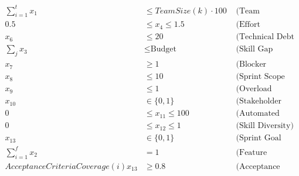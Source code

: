 \documentclass{article}
\begin{document}
\begin{align*}
\sum_{i=1}^{t} x_1 &\leq TeamSize(k) \cdot 100  &\text{ (Team Capacity)} \\
0.5 &\leq x_4 \leq 1.5  &\text{ (Effort Estimation Accuracy)} \\
x_6 &\leq 20 &\text{ (Technical Debt Limit)} \\
\sum_{j} x_3 &\leq \text{Budget} &\text{ (Skill Gap Investment)} \\
x_7 &\geq 1 &\text{ (Blocker Resolution Priority)} \\
x_8 &\leq 10 &\text{ (Sprint Scope Limit)} \\
x_9 &\leq 1 &\text{ (Overload Prevention)} \\
x_{10} &\in \{0, 1\} &\text{ (Stakeholder Engagement)} \\
0 &\leq x_{11} \leq 100 &\text{ (Automated Testing Coverage)} \\
0 &\leq x_{12} \leq 1 &\text{ (Skill Diversity)} \\
x_{13} &\in \{0, 1\} &\text{ (Sprint Goal Focus)} \\
\sum_{i=1}^{f} x_2 &= 1 &\text{ (Feature Priority)} \\
AcceptanceCriteriaCoverage(i) x_{13} &\geq 0.8 &\text{ (Acceptance Criteria)} \\
\end{align*}
\end{document}
